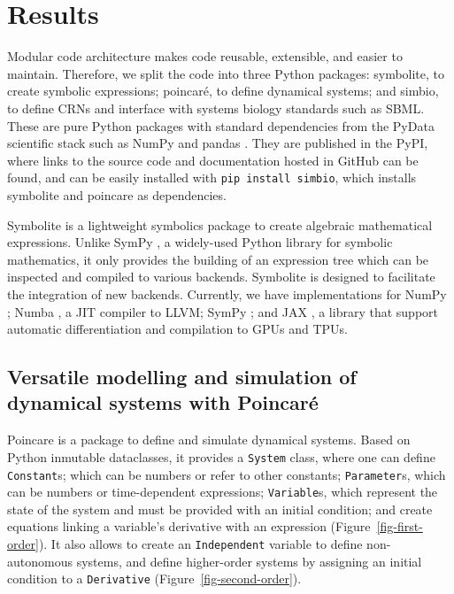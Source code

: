 \documentclass[namedate,numsec,webpdf,modern,large]{oup-authoring-template}
\theoremstyle{thmstyleone}%
\theoremstyle{thmstyletwo}%
\theoremstyle{thmstylethree}%
\begin{document}
\section{Results}\label{results}

Modular code architecture makes code reusable, extensible, and easier to maintain.
Therefore, we split the code into three Python packages:
symbolite, to create symbolic expressions;
poincaré, to define dynamical systems;
and simbio, to define \acp{CRN} and interface with systems biology standards such as \ac{SBML}.
These are pure Python packages with standard dependencies from the PyData scientific stack
such as NumPy \citep{harrisArrayProgrammingNumPy2020} and pandas \citep{mckinneyDataStructuresStatistical2010}.
They are published in the \acf{PyPI},
where links to the source code and documentation hosted in GitHub can be found,
and can be easily installed with \texttt{pip\ install\ simbio},
which installs symbolite and poincare as dependencies.

Symbolite is a lightweight symbolics package to create algebraic mathematical expressions.
Unlike SymPy \citep{meurerSymPySymbolicComputing2017},
a widely-used Python library for symbolic mathematics,
it only provides the building of an expression tree
which can be inspected and compiled to various backends.
Symbolite is designed to facilitate the integration of new backends.
Currently, we have implementations for
NumPy \citep{harrisArrayProgrammingNumPy2020};
Numba \citep{lamNumbaLLVMbasedPython2015},
a \ac{JIT} compiler to LLVM;
SymPy \citep{meurerSymPySymbolicComputing2017};
and JAX \citep{jax2018github}, a
library that support automatic differentiation and compilation to \acp{GPU} and \acp{TPU}.

\subsection{Versatile modelling and simulation of dynamical systems with Poincaré}
\label{versatile-modelling-and-simulation-of-dynamical-systems-with-poincaruxe9}

Poincare is a package to define and simulate dynamical systems.
Based on Python inmutable dataclasses,
it provides a \texttt{System} class,
where one can define
\texttt{Constant}s; which can be numbers or refer to other constants;
\texttt{Parameter}s, which can be numbers or time-dependent expressions;
\texttt{Variable}s, which represent the state of the system and must be provided with an initial condition;
and create equations linking a variable's derivative with an expression (Figure~\ref{fig-first-order}).
It also allows to
create an \texttt{Independent} variable to define non-autonomous systems,
and define higher-order systems by assigning an initial condition to a \texttt{Derivative} (Figure~\ref{fig-second-order}).
\end{document}
